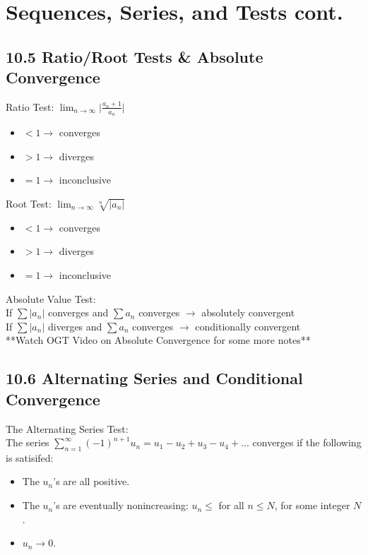 \documentclass{article}
\begin{document}
    \section{Sequences, Series, and Tests cont.}
        \color{Emerald}
        \subsection*{10.5 Ratio/Root Tests \& Absolute Convergence}
            Ratio Test: $\lim_{n\to\infty} \lvert \frac{a_{n} + 1}{a_{n}} \rvert$ \\
            \begin{itemize}
                \item $< 1 \rightarrow$ converges \\
                \item $> 1 \rightarrow$ diverges \\
                \item $= 1 \rightarrow$ inconclusive \\
            \end{itemize}
            Root Test: $\lim_{n\to\infty} \sqrt[n]{\lvert a_{n} \rvert}$ \\
            \begin{itemize}
                \item $< 1 \rightarrow$ converges \\
                \item $> 1 \rightarrow$ diverges \\
                \item $= 1 \rightarrow$ inconclusive \\
            \end{itemize}
            Absolute Value Test: \\
            If $\sum \lvert a_{n} \rvert$ converges and $\sum a_{n}$ converges $\rightarrow$ absolutely convergent \\
            If $\sum \lvert a_{n} \rvert$ diverges and $\sum a_{n}$ converges $\rightarrow$ conditionally convergent \\
            **Watch OGT Video on Absolute Convergence for some more notes** \\
        \color{Mulberry}
        \subsection*{10.6 Alternating Series and Conditional Convergence}
            The Alternating Series Test: \\
            The series $\sum_{n=1}^{\infty} (-1)^{n+1} u_{n} = u_{1} - u_{2} + u_{3} -u_{4} + ...$ converges if the following is satisifed: \\
            \begin{itemize}
                \item The $u_{n}$'s are all positive. \\
                \item The $u_{n}$'s are eventually nonincreasing: $u_{n} \leq$ for all $n \leq N$, for some integer $N$.
                \item $u_{n} \rightarrow 0$.
            \end{itemize}
        \color{Red}
\end{document}
